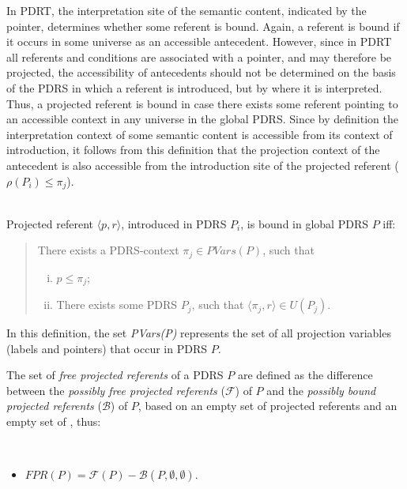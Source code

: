 In PDRT, the interpretation site of the semantic content, indicated by the
pointer, determines whether some referent is bound. Again, a referent is
bound if it occurs in some universe as an accessible antecedent. However,
since in PDRT all referents and conditions are associated with a pointer,
and may therefore be projected, the accessibility of antecedents should not
be determined on the basis of the PDRS in which a referent is introduced,
but by where it is interpreted. Thus, a projected referent is bound in case
there exists some referent pointing to an accessible context in any universe
in the global PDRS. Since by definition the interpretation context of some semantic
content is accessible from its context of introduction, it follows from this
definition that the projection context of the antecedent is also accessible
from the introduction site of the projected referent ($\rho(P_i) \leq
\pi_j$). 

\begin{definition}~\\
Projected referent $\langle p,r\rangle$, introduced in PDRS $P_i$, is bound
in global PDRS $P$ iff:
\begin{quote}
There exists a PDRS-context $\pi_j \in PVars(P)$, such that
\begin{enumerate}[i.]
  \item $p \leq \pi_j$; 
  \item There exists some PDRS $P_j$, such that 
    $\langle \pi_j,r\rangle \in U(P_j)$.
\end{enumerate}
\end{quote}
\end{definition}

\noindent In this definition, the set \textit{PVars(P)} represents the set
of all projection variables (labels and pointers) that occur in PDRS $P$.


The set of \textit{free projected referents} of a PDRS $P$ are defined as the
difference between the \textit{possibly free projected referents} ($\mathcal{F}$) of
$P$ and the \textit{possibly bound projected referents} ($\mathcal{B}$) of $P$, based
on an empty set of projected referents and an empty set of \MAPs, thus:

\begin{definition}~
  \begin{itemize}
    \item $FPR(P) = \mathcal{F}(P) - \mathcal{B}(P,\emptyset,\emptyset)$.
  \end{itemize}
\end{definition}

